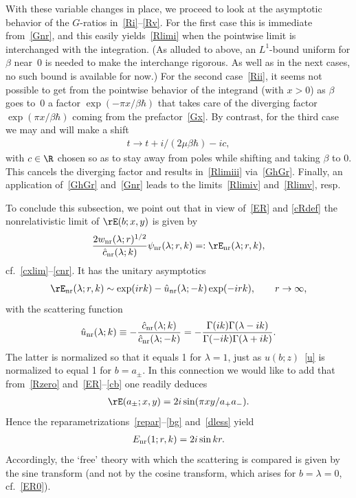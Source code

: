 \documentclass[pdftex]{sigma}
\numberwithin{equation}{section}
\begin{document}
With these variable changes in place, we proceed to look at the asymptotic behavior of the $G$-ratios in~\eqref{Ri}--\eqref{Rv}. For the f\/irst case this is immediate from~\eqref{Gnr}, and this easily yields~\eqref{Rlimi} when the pointwise limit is interchanged with the integration. (As alluded to above, an $L^1$-bound uniform for $\beta$ near~0 is needed to make the interchange rigorous. As well as in the next cases, no such bound is available for now.) For the second case~\eqref{Rii}, it seems not possible to get from the pointwise behavior of the integrand (with $x>0$) as $\beta$ goes to~0 a factor $\exp(-\pi x /\beta\hbar)$ that takes care of the diverging factor $\exp(\pi x/\beta\hbar)$ coming from the prefactor~\eqref{Gx}. By contrast, for the third case we may and will make a shift
\begin{gather}
t\to t +i/(2\mu \beta\hbar)-ic,
\end{gather}
with $c\in\R$ chosen so as to stay away from poles while shifting and taking $\beta $ to 0. This cancels the diverging factor and results in~\eqref{Rlimiii} via~\eqref{GhGr}. Finally, an application of~\eqref{GhGr} and~\eqref{Gnr} leads to the limits~\eqref{Rlimiv} and~\eqref{Rlimv}, resp.

To conclude this subsection, we point out that in view of~\eqref{ER} and \eqref{cRdef} the nonrelativistic limit of $\rE(b;x,y)$ is given by
\begin{gather}
 \frac{2w_{\rm nr}(\lambda;r)^{1/2}}{\hat{c}_{\rm nr}(\lambda;k)}\psi_{\rm nr}(\lambda;r,k)=:\rE_{\rm nr}(\lambda;r,k),
\end{gather}
cf.~\eqref{cxlim}--\eqref{cnr}. It has the unitary asymptotics
\begin{gather}
\rE_{\rm nr}(\lambda;r,k)\sim \exp(irk)-\hat{u}_{\rm nr}(\lambda;-k)\exp(-irk),\qquad r\to\infty,
\end{gather}
with the scattering function
\begin{gather}
\hat{u}_{\rm nr}(\lambda;k)\equiv -\frac{\hat{c}_{\rm nr}(\lambda;k)}{\hat{c}_{\rm nr}(\lambda;-k)}=-\frac{\Gamma(ik)\Gamma(\lambda-ik)}{\Gamma(-ik)\Gamma(\lambda+ik)}.
\end{gather}
The latter is normalized so that it equals 1 for $\lambda =1$, just as $u(b;z)$~\eqref{u} is normalized to equal 1 for $b=a_{\pm}$. In this connection we would like to add that from~\eqref{Rzero} and~\eqref{ER}--\eqref{cb} one readily deduces
\begin{gather}
\rE(a_{\pm};x,y)=2i\sin(\pi xy/a_+a_-).
\end{gather}
Hence the reparametrizations~\eqref{repar}--\eqref{bg} and~\eqref{dless} yield
\begin{gather}
E_{\rm nr}(1;r,k)=2i\sin kr.
\end{gather}
Accordingly, the `free' theory with which the scattering is compared is given by the sine transform (and not by the cosine transform, which arises for $b=\lambda=0$, cf.~\eqref{ER0}).
\end{document}
